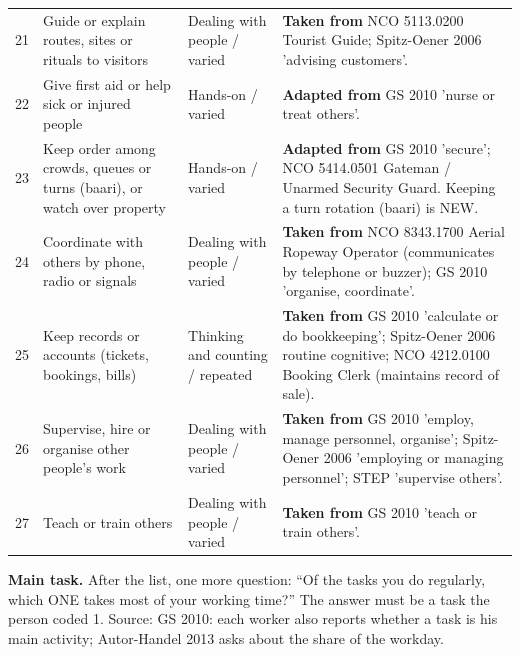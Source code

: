 \documentclass[11pt]{article}
\begin{document}
{\begin{longtable}{p{0.7cm}p{4.2cm}p{2.7cm}p{6.9cm}}
21 & Guide or explain routes, sites or rituals to visitors & Dealing with people / varied & \textbf{Taken from} NCO 5113.0200 Tourist Guide; Spitz-Oener 2006 'advising customers'. \\
22 & Give first aid or help sick or injured people & Hands-on / varied & \textbf{Adapted from} GS 2010 'nurse or treat others'. \\
23 & Keep order among crowds, queues or turns (baari), or watch over property & Hands-on / varied & \textbf{Adapted from} GS 2010 'secure'; NCO 5414.0501 Gateman / Unarmed Security Guard. Keeping a turn rotation (baari) is NEW. \\
24 & Coordinate with others by phone, radio or signals & Dealing with people / varied & \textbf{Taken from} NCO 8343.1700 Aerial Ropeway Operator (communicates by telephone or buzzer); GS 2010 'organise, coordinate'. \\
25 & Keep records or accounts (tickets, bookings, bills) & Thinking and counting / repeated & \textbf{Taken from} GS 2010 'calculate or do bookkeeping'; Spitz-Oener 2006 routine cognitive; NCO 4212.0100 Booking Clerk (maintains record of sale). \\
26 & Supervise, hire or organise other people's work & Dealing with people / varied & \textbf{Taken from} GS 2010 'employ, manage personnel, organise'; Spitz-Oener 2006 'employing or managing personnel'; STEP 'supervise others'. \\
27 & Teach or train others & Dealing with people / varied & \textbf{Taken from} GS 2010 'teach or train others'. \\
\bottomrule
\end{longtable}
}
\textbf{Main task.} After the list, one more question: ``Of the tasks you do regularly, which ONE takes most of your working time?'' The answer must be a task the person coded 1. Source: GS 2010: each worker also reports whether a task is his main activity; Autor-Handel 2013 asks about the share of the workday.
\end{document}
